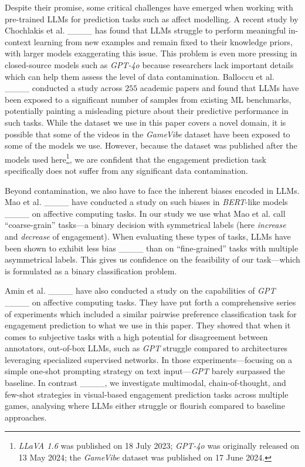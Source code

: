 Despite their promise, some critical challenges have emerged when working with pre-trained LLMs for prediction tasks such as affect modelling. A recent study by Chochlakis et al. ____ has found that LLMs struggle to perform meaningful in-context learning from new examples and remain fixed to their knowledge priors, with larger models exaggerating this issue. This problem is even more pressing in closed-source models such as \emph{GPT-4o} because researchers lack important details which can help them assess the level of data contamination. Balloccu et al. ____ conducted a study across $255$ academic papers and found that LLMs have been exposed to a significant number of samples from existing ML benchmarks, potentially painting a misleading picture about their predictive performance in such tasks. 
%
While the dataset we use in this paper covers a novel domain, it is possible that some of the videos in the \emph{GameVibe} dataset have been exposed to some of the models we use. However, because the dataset was published after the models used here\footnote{\emph{LLaVA 1.6} was published on 18 July 2023; \emph{GPT-4o} was originally released on 13 May 2024; the \emph{GameVibe} dataset was published on 17 June 2024.}, we are confident that the engagement prediction task specifically does not suffer from any significant data contamination.

Beyond contamination, we also have to face the inherent biases encoded in LLMs. Mao et al. ____ have conducted a study on such biases in \emph{BERT}-like models ____ on affective computing tasks. 
% 
In our study we use what Mao et al. call ``coarse-grain'' tasks---a binary decision with symmetrical labels (here \emph{increase} and \emph{decrease} of engagement). When evaluating these types of tasks, LLMs have been shown to exhibit less bias ____ than on ``fine-grained'' tasks with multiple asymmetrical labels. This gives us confidence on the feasibility of our task---which is formulated as a binary classification problem. 

Amin et al. ____ have also conducted a study on the capabilities of \emph{GPT} ____ on affective computing tasks. They have put forth a comprehensive series of experiments which included a similar pairwise preference classification task for engagement prediction to what we use in this paper. They showed that when it comes to subjective tasks with a high potential for disagreement between annotators, out-of-box LLMs, such as \emph{GPT} struggle compared to architectures leveraging specialized supervised networks. In those experiments---focusing  on a simple one-shot prompting strategy on text input---\emph{GPT} barely surpassed the baseline. In contrast ____, we investigate multimodal, chain-of-thought, and few-shot strategies in visual-based engagement prediction tasks across multiple games, analysing where LLMs either struggle or flourish compared to baseline approaches.

